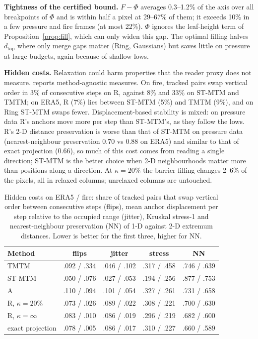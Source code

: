 \documentclass[review]{vgtc}                 %
\newcommand{\dtop}{d_{\mathrm{top}}}
\begin{document}
\textbf{Tightness of the certified bound.} $F-\Phi$ averages 0.3--1.2\% of the axis over all breakpoints of $\Phi$ and is within half a pixel at 29--67\% of them; it exceeds 10\% in a few pressure and fire frames (at most 22\%). $\Phi$ ignores the leaf-height term of Proposition~\ref{prop:fill}, which can only widen this gap. The optimal filling halves $\dtop$ where only merge gaps matter (Ring, Gaussians) but saves little on pressure at large budgets, again because of shallow lows.

\textbf{Hidden costs.} Relaxation could harm properties that the reader proxy does not measure.  reports method-agnostic measures. On fire, tracked pairs swap vertical order in 3\% of consecutive steps on R, against 8\% and 33\% on ST-MTM and TMTM; on ERA5, R (7\%) lies between ST-MTM (5\%) and TMTM (9\%), and on Ring ST-MTM swaps fewer. Displacement-based stability is mixed: on pressure data R's anchors move more per step than ST-MTM's, as they follow the lows. R's 2-D distance preservation is worse than that of ST-MTM on pressure data (nearest-neighbour preservation 0.70 vs 0.88 on ERA5) and similar to that of exact projection (0.66), so much of this cost comes from reading a single direction; ST-MTM is the better choice when 2-D neighbourhoods matter more than positions along a direction. At $\kappa=20\%$ the barrier filling changes 2--6\% of the pixels, all in relaxed columns; unrelaxed columns are untouched.

\begin{table}[t]
\centering\small
\setlength{\tabcolsep}{2.4pt}
\begin{tabular}{lcccc}\toprule
Method & flips & jitter & stress & NN\\\midrule
TMTM & .092 / .334 & .046 / .102 & .317 / .458 & .746 / .639\\
ST-MTM & .050 / .076 & .027 / .053 & .194 / .256 & .877 / .753\\
A & .110 / .094 & .101 / .054 & .327 / .261 & .731 / .658\\
R, $\kappa=20\%$ & .073 / .026 & .089 / .022 & .308 / .221 & .700 / .630\\
R, $\kappa=\infty$ & .083 / .010 & .086 / .019 & .296 / .219 & .682 / .600\\
exact projection & .078 / .005 & .086 / .017 & .310 / .227 & .660 / .589\\\bottomrule
\end{tabular}
\caption{Hidden costs on ERA5 / fire: share of tracked pairs that swap vertical order between consecutive steps (flips), mean anchor displacement per step relative to the occupied range (jitter), Kruskal stress-1 and nearest-neighbour preservation (NN) of 1-D against 2-D extremum distances. Lower is better for the first three, higher for NN.}
\label{tab:hidden}
\end{table}
\end{document}
